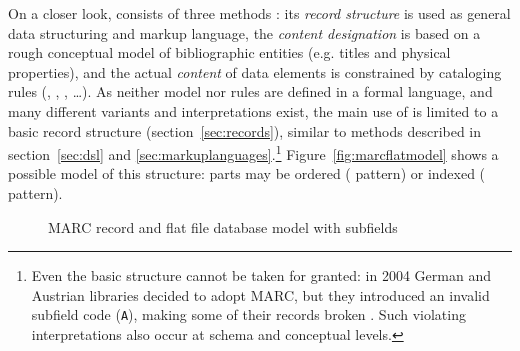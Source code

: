 On a closer look,  consists of three methods \cite{LoC2012}: its
\emph{record structure} is used as general data structuring and markup
language, the \emph{content designation} is based on a rough conceptual model
of bibliographic entities (e.g. titles and physical properties), and the actual
\emph{content} of data elements is constrained by cataloging rules
(, , , \ldots). As neither model nor rules
are defined in a formal language, and many different  variants and 
interpretations exist, the main use of  is limited to a
basic record structure (section~\ref{sec:records}), similar to methods
described in section~\ref{sec:dsl} and \ref{sec:markuplanguages}.\footnote{Even
the basic structure cannot be taken for granted: in 2004 German and
Austrian libraries decided to adopt MARC, but they introduced an invalid
subfield code (\texttt{A}), making some of their records broken . Such
violating interpretations also occur at schema and conceptual levels.}
Figure~\ref{fig:marcflatmodel} shows a possible model of this structure:
parts may be ordered ( pattern) or indexed
( pattern).

\begin{figure}[ht]
\flushright
{}
\caption{MARC record and flat file database model with subfields}
\label{fig:marcrecord}
\end{figure}

